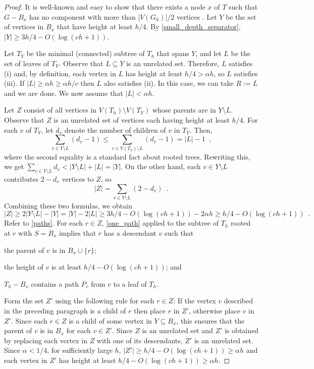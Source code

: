 \documentclass{patmorin}
\renewcommand{\le}{\leqslant}
\renewcommand{\ge}{\geqslant}
\begin{document}
\begin{proof}
  It is well-known and easy to show that there exists a node $x$ of $T$ such that $G-B_x$ has no component with more than $|V(G_h)|/2$ vertices \cite[(2.6)]{robertson.seymour:graph}. Let $Y$ be the set of vertices in $B_x$ that have height at least $h/4$.  By \cref{small_depth_separator}, $|Y|\ge 3h/4 - O(\log (ch+1))$.

  Let $T_Y$ be the minimal (connected) subtree of $T_h$ that spans $Y$, and let $L$ be the set of leaves of $T_Y$.  Observe that $L\subseteq Y$ is an unrelated set. Therefore, $L$ satisfies (i) and, by definition, each vertex in $L$ has height at least $h/4 > \alpha h$, so $L$ satisfies (iii).  If $|L|\ge \alpha h \ge \alpha h/c$ then $L$ also satisfies (ii).  In this case, we can take $R:=L$ and we are done.  We now assume that $|L|< \alpha h$.

  Let $Z$ consist of all vertices in $V(T_h)\setminus V(T_Y)$ whose parents are in $Y\setminus L$.   Observe that $Z$ is an unrelated set of vertices each having height at least $h/4$. For each $v$ of $T_Y$, let $d_v$ denote the number of children of $v$ in $T_Y$.  Then,
  \[
     \sum_{v\in Y\setminus L} (d_v-1)
     \le \sum_{v\in V(T_Y)\setminus L} (d_v-1)
     = |L|-1 \enspace ,
  \]
  where the second equality is a standard fact about rooted trees.
  Rewriting this, we get $\sum_{v\in Y\setminus L} {d_v} < |Y\setminus L| + |L| = |Y|$.  On the other hand, each $v\in Y\setminus L$ contributes $2-d_v$ vertices to $Z$, so
  \[
    |Z| = \sum_{v\in Y\setminus L} (2-d_v) \enspace .
  \]
  Combining these two formulas, we obtain
  \[
    |Z| \ge 2|Y\setminus L| - |Y| = |Y| - 2|L|
    \ge 3h/4-O(\log(ch+1)) - 2\alpha h
    \ge h/4-O(\log(ch+1)) \enspace .
  \]
  Refer to \cref{paths}.  For each $r\in Z$, \cref{one_path} applied to the subtree of $T_h$ rooted at $r$ with $S=B_x$ implies that $r$ has a descendant $v$ such that
  \begin{inparaenum}[(a)]
    \item the parent of $v$ is in $B_x\cup\{r\}$;
    \item the height of $v$ is at least $h/4-O(\log(ch+1))$; and
    \item $T_h-B_x$ contains a path $P_{v}$ from $v$ to a leaf of $T_h$.
  \end{inparaenum}

  Form the set $Z'$ using the following rule for each $r\in Z$: If the vertex $v$ described in the preceding paragraph is a child of $r$ then place $r$ in $Z'$, otherwise place $v$ in $Z'$. Since each $r\in Z$ is a child of some vertex in $Y\subseteq B_x$, this ensures that the parent of $v$ is in $B_x$ for each $v\in Z'$.  Since $Z$ is an unrelated set and $Z'$ is obtained by replacing each vertex in $Z$ with one of its descendants, $Z'$ is an unrelated set.  Since $\alpha < 1/4$, for sufficiently large $h$, $|Z'|\ge h/4 - O(\log(ch+1)) \ge \alpha h$ and each vertex in $Z'$ has height at least $h/4 - O(\log(ch+1)) \ge \alpha h$.


\end{proof}
\end{document}
